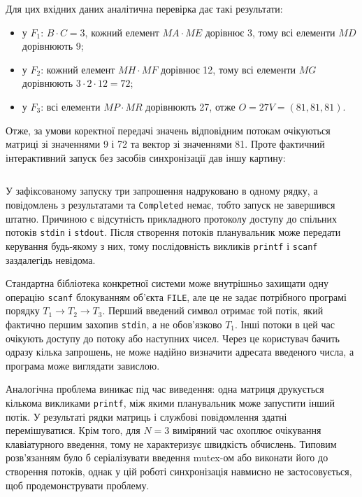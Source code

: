 \documentclass[12pt,a4paper]{article}
\begin{document}
Для цих вхідних даних аналітична перевірка дає такі результати:

\begin{itemize}[leftmargin=*,itemsep=0.35em]
  \item у \(F_1\): \(B\cdot C=3\), кожний елемент \(MA\cdot ME\)
    дорівнює 3, тому всі елементи \(MD\) дорівнюють 9;
  \item у \(F_2\): кожний елемент \(MH\cdot MF\) дорівнює 12, тому
    всі елементи \(MG\) дорівнюють \(3\cdot2\cdot12=72\);
  \item у \(F_3\): всі елементи \(MP\cdot MR\) дорівнюють 27,
    отже \(O=27V=(81,81,81)\).
\end{itemize}

Отже, за умови коректної передачі значень відповідним потокам очікуються
матриці зі значеннями 9 і 72 та вектор зі значеннями 81. Проте фактичний
інтерактивний запуск без засобів синхронізації дав іншу картину:

\begin{listing}[H]
\inputminted[firstline=1,lastline=4,fontsize=\footnotesize]{text}{out.txt}
\caption{Повний термінальний вивід проблемного запуску з \(N=3\)}
\end{listing}

У зафіксованому запуску три запрошення надруковано в одному рядку, а
повідомлень з результатами та \texttt{Completed} немає, тобто запуск не
завершився штатно. Причиною є відсутність прикладного протоколу доступу до
спільних потоків \texttt{stdin} і \texttt{stdout}. Після створення потоків
планувальник може передати керування будь-якому з них, тому послідовність
викликів \texttt{printf} і \texttt{scanf} заздалегідь невідома.

Стандартна бібліотека конкретної системи може внутрішньо захищати одну
операцію \texttt{scanf} блокуванням об'єкта \texttt{FILE}, але це не задає
потрібного програмі порядку \(T_1\to T_2\to T_3\). Перший введений символ
отримає той потік, який фактично першим захопив \texttt{stdin}, а не
обов'язково \(T_1\). Інші потоки в цей час очікують доступу до потоку або
наступних чисел. Через це користувач бачить одразу кілька запрошень, не може
надійно визначити адресата введеного числа, а програма може виглядати
завислою.

Аналогічна проблема виникає під час виведення: одна матриця друкується
кількома викликами \texttt{printf}, між якими планувальник може запустити
інший потік. У результаті рядки матриць і службові повідомлення здатні
перемішуватися. Крім того, для \(N=3\) виміряний час охоплює очікування
клавіатурного введення, тому не характеризує швидкість обчислень. Типовим
розв'язанням було б серіалізувати введення mutex-ом або виконати його до
створення потоків, однак у цій роботі синхронізація навмисно не
застосовується, щоб продемонструвати проблему.
\end{document}
